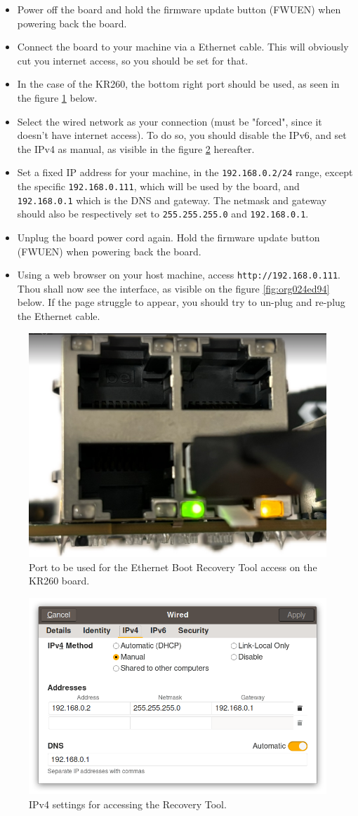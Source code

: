 \documentclass[10pt]{article}
\begin{document}
\begin{itemize}
\item Power off the board and hold the firmware update button (FWUEN) when powering back the board.
\item Connect the board to your machine via a Ethernet cable.
This will obviously cut you internet access, so you should be set for that.
\item In the case of the KR260, the bottom right port should be used, as seen in the
figure \ref{fig:org4718a8e} below.
\item Select the wired network as your connection (must be "forced", since it
doesn't have internet access). To do so, you should disable the IPv6, and set
the IPv4 as manual, as visible in the figure \ref{fig:org57711a3} hereafter.
\item Set a fixed IP address for your machine, in the \texttt{192.168.0.2/24}
range, except the specific \texttt{192.168.0.111}, which will be used by the
board, and \texttt{192.168.0.1} which is the DNS and gateway.
The netmask and gateway should also be respectively set to
\texttt{255.255.255.0} and \texttt{192.168.0.1}.
\item Unplug the board power cord again. Hold the firmware update button (FWUEN)
when powering back the board.
\item Using a web browser on your host machine, access \texttt{http://192.168.0.111}. Thou
shall now see the interface, as visible on the figure \ref{fig:org024ed94} below. If
the page struggle to appear, you should try to un-plug and re-plug the
Ethernet cable.
\end{itemize}

\begin{figure}[htbp]
\centering
\includegraphics[width=.4\textwidth]{img/krport.png}
\caption{\label{fig:org4718a8e}Port to be used for the Ethernet Boot Recovery Tool access on the KR260 board.}
\end{figure}

\begin{figure}[htbp]
\centering
\includegraphics[width=.6\textwidth]{img/ipv4set.png}
\caption{\label{fig:org57711a3}IPv4 settings for accessing the Recovery Tool.}
\end{figure}
\end{document}
